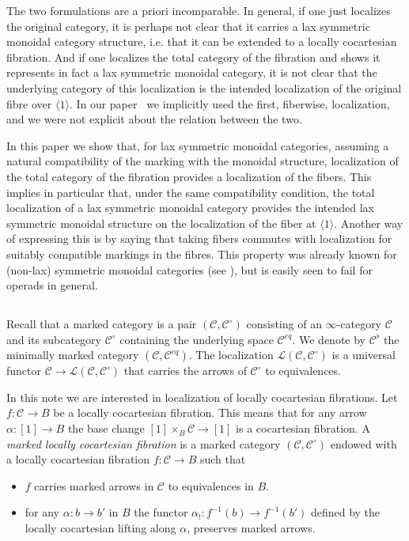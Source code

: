 \documentclass[12pt]{amsart}%
\newcommand{\eq}{\mathit{eq}}
\newcommand{\cC}{\mathcal{C}}
\newcommand{\cL}{\mathcal{L}}
\begin{document}
The two formulations are a priori incomparable.  In general, if one just localizes the original category, it is perhaps not clear that it carries a lax symmetric monoidal category structure, i.e. that it can be extended to a locally cocartesian fibration. And if one localizes the total category of the fibration and shows it represents in fact a lax symmetric monoidal category, it is not clear that the underlying category of this localization is the intended localization of the original fibre over 
$\langle 1\rangle$. In our paper~\cite{HM} we implicitly used the first, fiberwise, localization, and we were not explicit about the relation
between the two.

 In this paper we show that,
for lax symmetric monoidal categories, assuming a natural compatibility
of the marking with the monoidal structure,  localization of the 
total category of the fibration provides a localization of the fibers. 
This implies in particular that, under the same compatibility condition, the total localization of a lax 
symmetric monoidal category provides the intended lax symmetric monoidal structure on 
the localization of the fiber at $\langle 1\rangle$. 
Another way of expressing this is by saying that taking fibers 
commutes with localization for suitably compatible markings in the fibres.
This property was already known for (non-lax) symmetric monoidal categories (see \cite{H.L}), but is easily seen to fail for operads in general.









\subsection{}

Recall that a marked category is a pair $(\cC,\cC^\circ)$ consisting
of an $\infty$-category $\cC$ and its subcategory $\cC^\circ$ 
containing the underlying space $\cC^\eq$. We denote by $\cC^\flat$
the minimally marked category $(\cC,\cC^\eq)$.
The localization $\cL(\cC,\cC^\circ)$ is a universal functor 
$\cC\to\cL(\cC,\cC^\circ)$ that carries the arrows of $\cC^\circ$ to equivalences.


In this note we are interested in localization of locally cocartesian fibrations. Let $f:\cC\to B$ be a locally cocartesian fibration.
This means that for any arrow
$\alpha:[1]\to B$ the base change $[1]\times_B\cC\to[1]$
is a cocartesian fibration. 
A {\sl marked locally cocartesian fibration} is a marked category 
$(\cC,\cC^\circ)$ endowed with a locally cocartesian fibration
$f:\cC\to B$ such that
\begin{itemize}
\item $f$ carries marked arrows in $\cC$ to equivalences in $B$.
\item for any $\alpha:b\to b'$ in $B$ the functor $\alpha_!:f^{-1}(b)\to f^{-1}(b')$ defined by the locally cocartesian lifting along $\alpha$,
preserves marked arrows.
\end{itemize}
\end{document}
